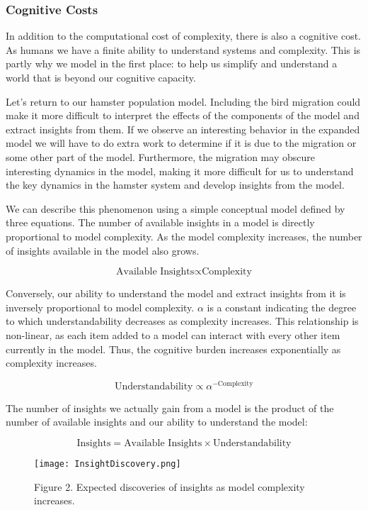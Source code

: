 \documentclass[]{memoir}
\let\Oldincludegraphics\includegraphics
\renewcommand{\includegraphics}[1]{\Oldincludegraphics[max size={\textwidth}{\textheight}]{#1}}
\begin{document}
\subsubsection{Cognitive Costs}

In addition to the computational cost of complexity, there is also a
cognitive cost. As humans we have a finite ability to understand systems
and complexity. This is partly why we model in the first place: to help
us simplify and understand a world that is beyond our cognitive
capacity.

Let's return to our hamster population model. Including the bird
migration could make it more difficult to interpret the effects of the
components of the model and extract insights from them. If we observe an
interesting behavior in the expanded model we will have to do extra work
to determine if it is due to the migration or some other part of the
model. Furthermore, the migration may obscure interesting dynamics in
the model, making it more difficult for us to understand the key
dynamics in the hamster system and develop insights from the model.

We can describe this phenomenon using a simple conceptual model defined
by three equations. The number of available insights in a model is
directly proportional to model complexity. As the model complexity
increases, the number of insights available in the model also grows.

\[ \text{Available Insights} \propto \text{Complexity} \]

Conversely, our ability to understand the model and extract insights
from it is inversely proportional to model complexity. $\alpha$ is a
constant indicating the degree to which understandability decreases as
complexity increases. This relationship is non-linear, as each item
added to a model can interact with every other item currently in the
model. Thus, the cognitive burden increases exponentially as complexity
increases.

\[ \text{Understandability} \propto \alpha^{-\text{Complexity}} \]

The number of insights we actually gain from a model is the product of
the number of available insights and our ability to understand the
model:

\[ \text{Insights} = \text{Available Insights} \times \text{Understandability} \]

\begin{figure}[htbp]
\centering
\texttt{[image: InsightDiscovery.png]}
\caption{Figure 2. Expected discoveries of insights as model complexity
increases.}
\end{figure}
\end{document}
